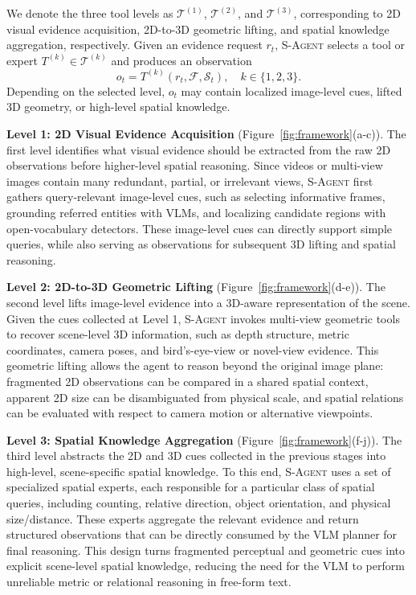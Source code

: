 % 
We denote the three tool levels as $\mathcal{T}^{(1)}$, $\mathcal{T}^{(2)}$, and $\mathcal{T}^{(3)}$, corresponding to 2D visual evidence acquisition, 2D-to-3D geometric lifting, and spatial knowledge aggregation, respectively. 
Given an evidence request $r_t$, \textsc{S-Agent} selects a tool or expert $T^{(k)} \in \mathcal{T}^{(k)}$ and produces an observation
\[
    o_t = T^{(k)}(r_t, \mathcal{F}, \mathcal{S}_t), \quad k \in \{1,2,3\}.
\]
Depending on the selected level, $o_t$ may contain localized image-level cues, lifted 3D geometry, or high-level spatial knowledge.


\textbf{Level 1: 2D Visual Evidence Acquisition} (Figure~\ref{fig:framework}(a-c)).
The first level identifies what visual evidence should be extracted from the raw 2D observations before higher-level spatial reasoning. 
Since videos or multi-view images contain many redundant, partial, or irrelevant views, \textsc{S-Agent} first gathers query-relevant image-level cues, such as selecting informative frames, grounding referred entities with VLMs, and localizing candidate regions with open-vocabulary detectors. 
These image-level cues can directly support simple queries, while also serving as observations for subsequent 3D lifting and spatial reasoning.

\textbf{Level 2: 2D-to-3D Geometric Lifting} (Figure~\ref{fig:framework}(d-e)). 
The second level lifts image-level evidence into a 3D-aware representation of the scene. 
Given the cues collected at Level 1, \textsc{S-Agent} invokes multi-view geometric tools to recover scene-level 3D information, such as depth structure, metric coordinates, camera poses, and bird's-eye-view or novel-view evidence.
% 
This geometric lifting allows the agent to reason beyond the original image plane: fragmented 2D observations can be compared in a shared spatial context, apparent 2D size can be disambiguated from physical scale, and spatial relations can be evaluated with respect to camera motion or alternative viewpoints.

\textbf{Level 3: Spatial Knowledge Aggregation} (Figure~\ref{fig:framework}(f-j)).
The third level abstracts the 2D and 3D cues collected in the previous stages into high-level, scene-specific spatial knowledge. 
To this end, \textsc{S-Agent} uses a set of specialized spatial experts, each responsible for a particular class of spatial queries, including counting, relative direction, object orientation, and physical size/distance. 
These experts aggregate the relevant evidence and return structured observations that can be directly consumed by the VLM planner for final reasoning. 
This design turns fragmented perceptual and geometric cues into explicit scene-level spatial knowledge, reducing the need for the VLM to perform unreliable metric or relational reasoning in free-form text.

